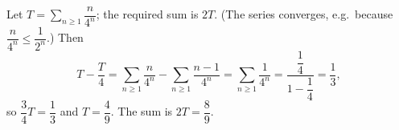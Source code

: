 Let $T=\displaystyle\sum_{n\ge1}\dfrac{n}{4^n}$; the required sum is $2T$. (The series converges, e.g.\ because $\dfrac{n}{4^n}\le\dfrac{1}{2^n}$.) Then
\[
T-\dfrac {T}{4}=\sum_{n\ge1}\dfrac{n}{4^n}-\sum_{n\ge1}\dfrac{n-1}{4^n}=\sum_{n\ge1}\dfrac{1}{4^n}=\dfrac{\dfrac{1}{4}}{1-\dfrac{1}{4}}=\dfrac{1}{3} ,
\]
so $\dfrac{3}{4}T=\dfrac{1}{3}$ and $T=\dfrac{4}{9}$. The sum is $2T=\boxed{\dfrac{8}{9}}$.
